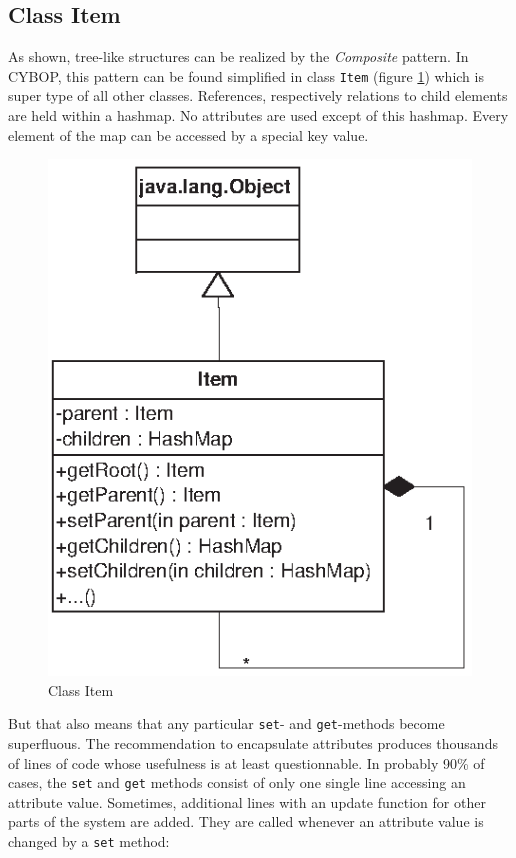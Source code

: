 \subsection{Class Item}
\label{class_item_heading}

As shown, tree-like structures can be realized by the \emph{Composite} pattern.
In CYBOP, this pattern can be found simplified in class {\tt Item}
(figure \ref{class_item_figure}) which is super type of all other classes.
References, respectively relations to child elements are held within a hashmap.
No attributes are used except of this hashmap. Every element of the map can be
accessed by a special key value.

\begin{figure}[ht]
    \begin{center}
       \includegraphics[scale=0.8]{eps/item.eps}
       \caption{Class Item}
       \label{class_item_figure}
    \end{center}
\end{figure}

But that also means that any particular \texttt{set}- and \texttt{get}-methods
become superfluous. The recommendation to encapsulate attributes produces thousands
of lines of code whose usefulness is at least questionnable. In probably 90\% of
cases, the \texttt{set} and \texttt{get} methods consist of only one single line
accessing an attribute value. Sometimes, additional lines with an update function
for other parts of the system are added. They are called whenever an attribute
value is changed by a \texttt{set} method:

